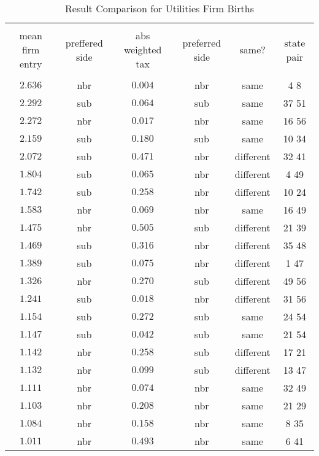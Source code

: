 
\begin{table}[!htbp] \centering 
  \caption{Result Comparison for Utilities Firm Births} 
  \label{} 
\small 
\begin{tabular}{@{\extracolsep{5pt}} cccccc} 
\\[-1.8ex]\hline 
\hline \\[-1.8ex] 
mean firm entry & preffered side & abs weighted tax & preferred side & same? & state pair \\ 
\hline \\[-1.8ex] 
$2.636$ & nbr & $0.004$ & nbr & same & 4 8  \\ 
$2.292$ & sub & $0.064$ & sub & same & 37 51  \\ 
$2.272$ & nbr & $0.017$ & nbr & same & 16 56  \\ 
$2.159$ & sub & $0.180$ & sub & same & 10 34  \\ 
$2.072$ & sub & $0.471$ & nbr & different & 32 41  \\ 
$1.804$ & sub & $0.065$ & nbr & different & 4 49  \\ 
$1.742$ & sub & $0.258$ & nbr & different & 10 24  \\ 
$1.583$ & nbr & $0.069$ & nbr & same & 16 49  \\ 
$1.475$ & nbr & $0.505$ & sub & different & 21 39  \\ 
$1.469$ & sub & $0.316$ & nbr & different & 35 48  \\ 
$1.389$ & sub & $0.075$ & nbr & different & 1 47  \\ 
$1.326$ & nbr & $0.270$ & sub & different & 49 56  \\ 
$1.241$ & sub & $0.018$ & nbr & different & 31 56  \\ 
$1.154$ & sub & $0.272$ & sub & same & 24 54  \\ 
$1.147$ & sub & $0.042$ & sub & same & 21 54  \\ 
$1.142$ & nbr & $0.258$ & sub & different & 17 21  \\ 
$1.132$ & nbr & $0.099$ & sub & different & 13 47  \\ 
$1.111$ & nbr & $0.074$ & nbr & same & 32 49  \\ 
$1.103$ & nbr & $0.208$ & nbr & same & 21 29  \\ 
$1.084$ & nbr & $0.158$ & nbr & same & 8 35  \\ 
$1.011$ & nbr & $0.493$ & nbr & same & 6 41  \\ 

\end{tabular}
\end{table}

